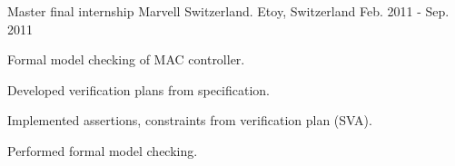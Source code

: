 \begin{cventries}
  \cventry
    {Master final internship} %
    {Marvell Switzerland.} %
    {Etoy, Switzerland} %
    {Feb. 2011 - Sep. 2011} %
    {
      \begin{cvitems} %
        \item {Formal model checking of MAC controller.}
        \item {Developed verification plans from specification.}
        \item {Implemented assertions, constraints from verification plan (SVA).}
        \item {Performed formal model checking.}
      \end{cvitems}
    }

\end{cventries}

